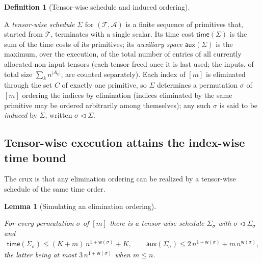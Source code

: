 \documentclass[sn-mathphys, natbib=false]{sn-jnl}
\theoremstyle{plain}
\newtheorem{lemma}{Lemma}
\theoremstyle{definition}
\newtheorem{definition}{Definition}
\newif\ifshowchanges
\newcommand{\rev}[1]{%
  \ifshowchanges
    {\color{red} #1}%
  \else
    #1%
  \fi
}
\def\calA{\mathcal{A}}
\def\calT{\mathcal{T}}
\begin{document}
\begin{bibunit}[agsm]
\begin{definition}[Tensor-wise schedule and induced ordering]
\label{def:tw_schedule}
\rev{A \emph{tensor-wise schedule} $\Sigma$ for $(\calT, \calA)$ is a finite sequence of primitives that, started from $\calT$, terminates with a single scalar. Its time cost $\mathsf{time}(\Sigma)$ is the sum of the time costs of its primitives; its \emph{auxiliary space} $\mathsf{aux}(\Sigma)$ is the maximum, over the execution, of the total number of entries of all currently allocated non-input tensors (each tensor freed once it is last used; the inputs, of total size $\sum_k n^{|A_k|}$, are counted separately). Each index of $[m]$ is eliminated through the set $C$ of exactly one primitive, so $\Sigma$ determines a permutation $\sigma$ of $[m]$ ordering the indices by elimination (indices eliminated by the same primitive may be ordered arbitrarily among themselves); any such $\sigma$ is said to be \emph{induced} by $\Sigma$, written $\sigma \vartriangleleft \Sigma$.}
\end{definition}

\subsection{Tensor-wise execution attains the index-wise time bound}

\rev{The crux is that any elimination ordering can be realized by a tensor-wise schedule of the same time order.}

\begin{lemma}[Simulating an elimination ordering]
\label{lem:tw_upper}
\rev{For every permutation $\sigma$ of $[m]$ there is a tensor-wise schedule $\Sigma_\sigma$ with $\sigma \vartriangleleft \Sigma_\sigma$ and
\begin{align*}
\mathsf{time}(\Sigma_\sigma) \le (K + m)\, n^{1 + \mathsf{w}(\sigma)} + K, \qquad \mathsf{aux}(\Sigma_\sigma) \le 2\, n^{1 + \mathsf{w}(\sigma)} + m\, n^{\mathsf{w}(\sigma)},
\end{align*}
the latter being at most $3\, n^{1 + \mathsf{w}(\sigma)}$ when $m \le n$.}
\end{lemma}


\end{bibunit}
\end{document}
